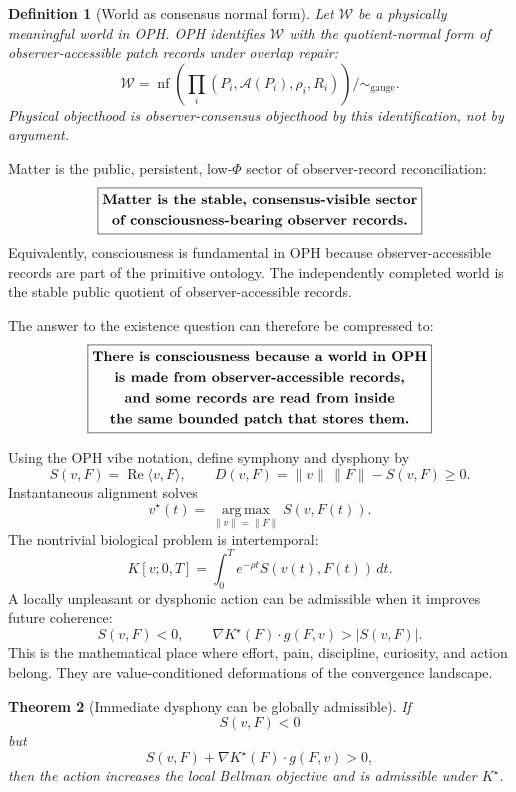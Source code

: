 \documentclass[11pt]{article}
\newtheorem{theorem}{Theorem}[section]
\newtheorem{definition}[theorem]{Definition}
\theoremstyle{remark}
\theoremstyle{plain}
\newcommand{\argmax}{\operatorname*{arg\,max}}
\begin{document}
\begin{definition}[World as consensus normal form]
Let \(\mathcal W\) be a physically meaningful world in OPH. OPH identifies \(\mathcal W\) with the quotient-normal form of observer-accessible patch records under overlap repair:
\[
\mathcal W
=
\operatorname{nf}\!\left(
\prod_i (P_i,\mathcal A(P_i),\rho_i,R_i)
\right)\big/\!\sim_{\mathrm{gauge}}.
\]
Physical objecthood is observer-consensus objecthood by this identification, not by argument.
\end{definition}

Matter is the public, persistent, low-\(\Phi\) sector of observer-record reconciliation:
\[
\boxed{
\begin{gathered}
\text{\bfseries Matter is the stable, consensus-visible sector}\\
\text{\bfseries of consciousness-bearing observer records.}
\end{gathered}
}
\]
Equivalently, consciousness is fundamental in OPH because observer-accessible records are part of the primitive ontology. The independently completed world is the stable public quotient of observer-accessible records.

The answer to the existence question can therefore be compressed to:
\[
\boxed{
\begin{gathered}
\text{\bfseries There is consciousness because a world in OPH}\\
\text{\bfseries is made from observer-accessible records,}\\
\text{\bfseries and some records are read from inside}\\
\text{\bfseries the same bounded patch that stores them.}
\end{gathered}
}
\]

Using the OPH vibe notation, define symphony and dysphony by
\[
S(v,F)=\operatorname{Re}\langle v,F\rangle,
\qquad
D(v,F)=\|v\|\,\|F\|-S(v,F)\ge 0.
\]
Instantaneous alignment solves
\[
v^\star(t)=\argmax_{\|v\|=\|F\|}S(v,F(t)).
\]
The nontrivial biological problem is intertemporal:
\[
K[v;0,T]
=
\int_0^T e^{-\rho t}S(v(t),F(t))\,dt.
\]
A locally unpleasant or dysphonic action can be admissible when it improves future coherence:
\[
S(v,F)<0,
\qquad
\nabla K^\star(F)\cdot g(F,v)>|S(v,F)|.
\]
This is the mathematical place where effort, pain, discipline, curiosity, and action belong. They are value-conditioned deformations of the convergence landscape.

\begin{theorem}[Immediate dysphony can be globally admissible]
If
\[
S(v,F)<0
\]
but
\[
S(v,F)+\nabla K^\star(F)\cdot g(F,v)>0,
\]
then the action increases the local Bellman objective and is admissible under \(K^\star\).
\end{theorem}
\end{document}
